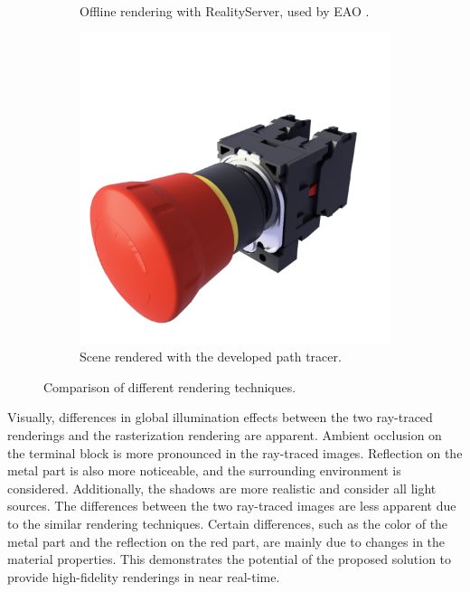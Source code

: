 \begin{figure}[H]
\begin{subfigure}[t]{0.3\textwidth}
    \caption{Offline rendering with \gls{RealityServer}, used by EAO \cite{eaoProductReference}.}
    \label{fig:offline-rendering}
  \end{subfigure}
  \hfill
  \begin{subfigure}[t]{0.3\textwidth}
    \includegraphics[width=\textwidth]{resources/comparison-strahl-rendering.png}
    \caption{Scene rendered with the developed path tracer.}
    \label{fig:strahl-rendering}
  \end{subfigure}
  \caption{Comparison of different rendering techniques.}
  \label{fig:final-rendering-comparison}
\end{figure}

Visually, differences in global illumination effects between the two ray-traced renderings and the rasterization rendering are apparent. Ambient occlusion on the terminal block is more pronounced in the ray-traced images. Reflection on the metal part is also more noticeable, and the surrounding environment is considered. Additionally, the shadows are more realistic and consider all light sources. The differences between the two ray-traced images are less apparent due to the similar rendering techniques. Certain differences, such as the color of the metal part and the reflection on the red part, are mainly due to changes in the material properties. This demonstrates the potential of the proposed solution to provide high-fidelity renderings in near real-time.

